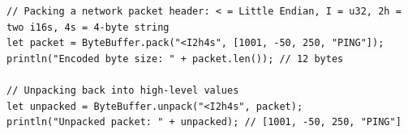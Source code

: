 \begin{lstlisting}[language=shaelang]
// Packing a network packet header: < = Little Endian, I = u32, 2h = two i16s, 4s = 4-byte string
let packet = ByteBuffer.pack("<I2h4s", [1001, -50, 250, "PING"]);
println("Encoded byte size: " + packet.len()); // 12 bytes

// Unpacking back into high-level values
let unpacked = ByteBuffer.unpack("<I2h4s", packet);
println("Unpacked packet: " + unpacked); // [1001, -50, 250, "PING"]
\end{lstlisting}
